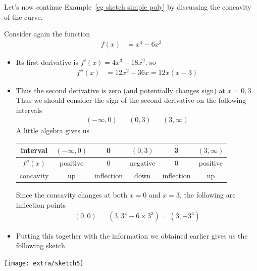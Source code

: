 Let's now continue Example~\ref{eg sketch simple poly} by discussing the
concavity of the
curve.
\begin{eg}\label{eg_3_6_2}
Consider again the function
\begin{align*}
  f(x) &= x^4-6x^3
\end{align*}
\begin{itemize}
 \item Its first derivative is $f'(x)=4x^3-18x^2$, so
\begin{align*}
  f''(x) &= 12x^2 - 36x = 12x(x-3)
\end{align*}
\item Thus the second derivative is zero (and potentially changes sign) at $x=0,3$. Thus
we should consider the sign of the second derivative on the following intervals
\begin{align*}
  (-\infty,0) && (0,3) && (3,\infty)
\end{align*}
A little algebra gives us
\begin{center}
\begin{tabular}{|c|c||c||c||c||c|}
\hline
interval & $(-\infty,0)$ & 0 & $(0,3)$ & 3 & $(3,\infty)$\\
\hline
$f''(x)$ & positive & 0 & negative & 0 & positive \\
\hline
concavity & up & inflection & down & inflection & up
\\
\hline
\end{tabular}
\end{center}
Since the concavity changes at both $x=0$ and $x=3$, the following are inflection points
\begin{align*}
  (0,0) && (3,3^4-6\times3^3)=(3,-3^4)
\end{align*}

\item Putting this together with the information we obtained earlier gives us the
following sketch
\end{itemize}
\begin{efig}
 \begin{center}
  \texttt{[image: extra/sketch5]}
 \end{center}

\end{efig}

\end{eg}



